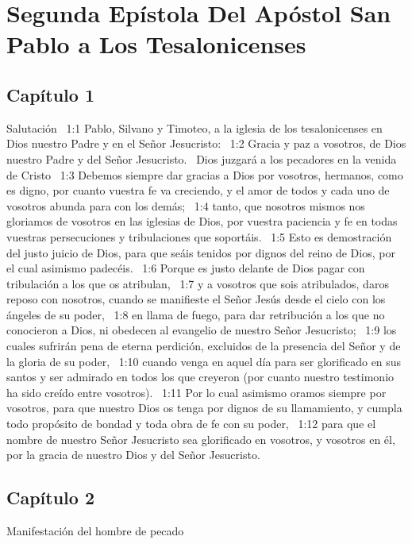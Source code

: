\chapter{Segunda Epístola Del Apóstol San Pablo a Los Tesalonicenses}


\section*{Capítulo 1 }
Salutación  
1:1 Pablo, Silvano y Timoteo, a la iglesia de los tesalonicenses en Dios nuestro Padre y en el Señor Jesucristo:  
1:2 Gracia y paz a vosotros, de Dios nuestro Padre y del Señor Jesucristo.  
Dios juzgará a los pecadores en la venida de Cristo  
1:3 Debemos siempre dar gracias a Dios por vosotros, hermanos, como es digno, por cuanto vuestra fe va creciendo, y el amor de todos y cada uno de vosotros abunda para con los demás;  
1:4 tanto, que nosotros mismos nos gloriamos de vosotros en las iglesias de Dios, por vuestra paciencia y fe en todas vuestras persecuciones y tribulaciones que soportáis.  
1:5 Esto es demostración del justo juicio de Dios, para que seáis tenidos por dignos del reino de Dios, por el cual asimismo padecéis.  
1:6 Porque es justo delante de Dios pagar con tribulación a los que os atribulan,  
1:7 y a vosotros que sois atribulados, daros reposo con nosotros, cuando se manifieste el Señor Jesús desde el cielo con los ángeles de su poder,  
1:8 en llama de fuego, para dar retribución a los que no conocieron a Dios, ni obedecen al evangelio de nuestro Señor Jesucristo;  
1:9 los cuales sufrirán pena de eterna perdición, excluidos de la presencia del Señor y de la gloria de su poder,  
1:10 cuando venga en aquel día para ser glorificado en sus santos y ser admirado en todos los que creyeron (por cuanto nuestro testimonio ha sido creído entre vosotros).  
1:11 Por lo cual asimismo oramos siempre por vosotros, para que nuestro Dios os tenga por dignos de su llamamiento, y cumpla todo propósito de bondad y toda obra de fe con su poder,  
1:12 para que el nombre de nuestro Señor Jesucristo sea glorificado en vosotros, y vosotros en él, por la gracia de nuestro Dios y del Señor Jesucristo.  
\section*{Capítulo 2 }
Manifestación del hombre de pecado  

